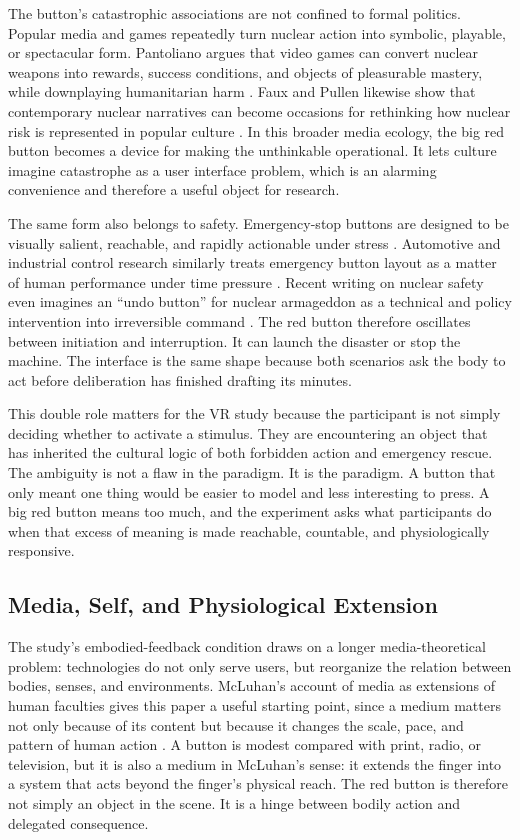 The button's catastrophic associations are not confined to formal politics. Popular media and games repeatedly turn nuclear action into symbolic, playable, or spectacular form. Pantoliano argues that video games can convert nuclear weapons into rewards, success conditions, and objects of pleasurable mastery, while downplaying humanitarian harm \citep{Pantoliano2025Playing}. Faux and Pullen likewise show that contemporary nuclear narratives can become occasions for rethinking how nuclear risk is represented in popular culture \citep{FauxPullen2025Catalyst}. In this broader media ecology, the big red button becomes a device for making the unthinkable operational. It lets culture imagine catastrophe as a user interface problem, which is an alarming convenience and therefore a useful object for research.

The same form also belongs to safety. Emergency-stop buttons are designed to be visually salient, reachable, and rapidly actionable under stress \citep{Kwon1996EmergencyStop}. Automotive and industrial control research similarly treats emergency button layout as a matter of human performance under time pressure \citep{ChoiEtAl2010EmergencyButtonLayout}. Recent writing on nuclear safety even imagines an ``undo button'' for nuclear armageddon as a technical and policy intervention into irreversible command \citep{AllenLevin2025UndoButton}. The red button therefore oscillates between initiation and interruption. It can launch the disaster or stop the machine. The interface is the same shape because both scenarios ask the body to act before deliberation has finished drafting its minutes.

This double role matters for the VR study because the participant is not simply deciding whether to activate a stimulus. They are encountering an object that has inherited the cultural logic of both forbidden action and emergency rescue. The ambiguity is not a flaw in the paradigm. It is the paradigm. A button that only meant one thing would be easier to model and less interesting to press. A big red button means too much, and the experiment asks what participants do when that excess of meaning is made reachable, countable, and physiologically responsive.

\subsection{Media, Self, and Physiological Extension}

The study's embodied-feedback condition draws on a longer media-theoretical problem: technologies do not only serve users, but reorganize the relation between bodies, senses, and environments. McLuhan's account of media as extensions of human faculties gives this paper a useful starting point, since a medium matters not only because of its content but because it changes the scale, pace, and pattern of human action \citep{McLuhan1964UnderstandingMedia}. A button is modest compared with print, radio, or television, but it is also a medium in McLuhan's sense: it extends the finger into a system that acts beyond the finger's physical reach. The red button is therefore not simply an object in the scene. It is a hinge between bodily action and delegated consequence.

